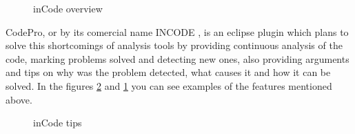 \begin{figure}[h]
\centering
{}
\caption{inCode overview \cite{tools:inCode} \label{fig:inCodeOverview}}
\end{figure}

	CodePro, or by its comercial name INCODE \cite{site:inCode}, is an eclipse
plugin which plans to solve this shortcomings of analysis tools by providing
continuous analysis of the code, marking problems solved and detecting new ones,
also providing arguments and tips on why was the problem detected, what causes
it and how it can be solved. In the figures \ref{fig:inCodeTips} and
\ref{fig:inCodeOverview} you can see examples of the features mentioned above.

\begin{figure}
\centering
{}
\caption{inCode tips \cite{tools:inCode} \label{fig:inCodeTips}}
\end{figure}


